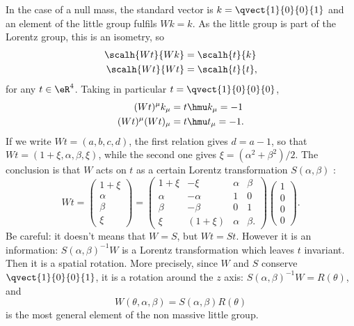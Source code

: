 In the case of a null mass, the standard vector is $k=\qvect{1}{0}{0}{1}$ and an element of the little group fulfils $Wk=k$. As the little group is part of the Lorentz group, this is an isometry, so
\begin{subequations}
\begin{align}
  \scalh{Wt}{Wk}&=\scalh{t}{k}\\
  \scalh{Wt}{Wt}&=\scalh{t}{t},
\end{align}  
\end{subequations}
for any $t\in\eR^4$. Taking in particular $t=\qvect{1}{0}{0}{0}$,
\begin{subequations}
\begin{align}
  (Wt)^{\mu}k_{\mu}&=t\hmu k_{\mu}=-1\\
  (Wt)^{\mu}(Wt)_{\mu}&=t\hmu t_{\mu}=-1.  
\end{align}  
\end{subequations}
If we write $Wt=({a},{b},{c},{d})$,  the first relation gives $d=a-1$, so that  $Wt=({1+\xi},{\alpha},{\beta},{\xi})$, while the second one gives $\xi=(\alpha^2+\beta^2)/2$. The conclusion is that $W$ acts on $t$ as a certain Lorentz transformation $S(\alpha,\beta)$ :
\begin{equation}
Wt=\begin{pmatrix}
     1+\xi\\
     \alpha\\
     \beta\\
     \xi
   \end{pmatrix}=
   \begin{pmatrix}
     1+\xi  & -\xi    & \alpha & \beta\\
     \alpha & -\alpha &   1    &   0\\
     \beta  & -\beta  &   0    &   1\\
     \xi    & (1+\xi) & \alpha & \beta.
   \end{pmatrix}
   \begin{pmatrix}
     1\\
     0\\
     0\\
     0
   \end{pmatrix}.
\end{equation}
Be careful: it doesn't means that $W=S$, but $Wt=St$. However it is an information: $S(\alpha,\beta)^{-1} W$ is a Lorentz transformation which leaves $t$ invariant. Then it is a spatial rotation. More precisely, since $W$ and $S$ conserve $\qvect{1}{0}{0}{1}$, it is a rotation around the $z$ axis: $S(\alpha,\beta)^{-1} W=R(\theta)$, and
\begin{equation}
  W(\theta,\alpha,\beta)=S(\alpha,\beta)R(\theta)
\end{equation}
is the most general element of the non massive little group.
